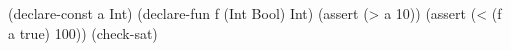 (declare-const a Int)
(declare-fun f (Int Bool) Int)
(assert (> a 10))
(assert (< (f a true) 100))
(check-sat)